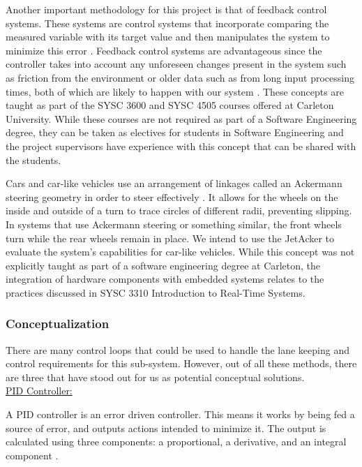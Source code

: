 \documentclass[titlepage,draft]{article}
\begin{document}
{Another important methodology for this project is that of feedback control systems. These systems are control systems that incorporate comparing the measured variable with its target value and then manipulates the system to minimize this error \cite{intro_to_feedback_sys}. Feedback control systems are advantageous since the controller takes into account any unforeseen changes present in the system such as friction from the environment or older data such as from long input processing times, both of which are likely to happen with our system \cite{intro_to_feedback_sys}. These concepts are taught as part of the SYSC 3600 and SYSC 4505 courses offered at Carleton University. While these courses are not required as part of a Software Engineering degree, they can be taken as electives for students in Software Engineering and the project supervisors have experience with this concept that can be shared with the students.

Cars and car-like vehicles use an arrangement of linkages called an Ackermann steering geometry in order to steer effectively \cite{AckermannSteer}. It allows for the wheels on the inside and outside of a turn to trace circles of different radii, preventing slipping. In systems that use Ackermann steering or something similar, the front wheels turn while the rear wheels remain in place. We intend to use the JetAcker to evaluate the system’s capabilities for car-like vehicles. While this concept was not explicitly taught as part of a software engineering degree at Carleton, the integration of hardware components with embedded systems relates to the practices discussed in SYSC 3310 Introduction to Real-Time Systems.

\subsubsection{Conceptualization}

There are many control loops that could be used to handle the lane keeping and control requirements for this sub-system. However, out of all these methods, there are three that have stood out for us as potential conceptual solutions.
\\

\underline{PID Controller:}

A PID controller is an error driven controller. This means it works by being fed a source of error, and outputs actions intended to minimize it. The output is calculated using three components: a proportional, a derivative, and an integral component \cite{pid_explanation}. 

}
\end{document}
